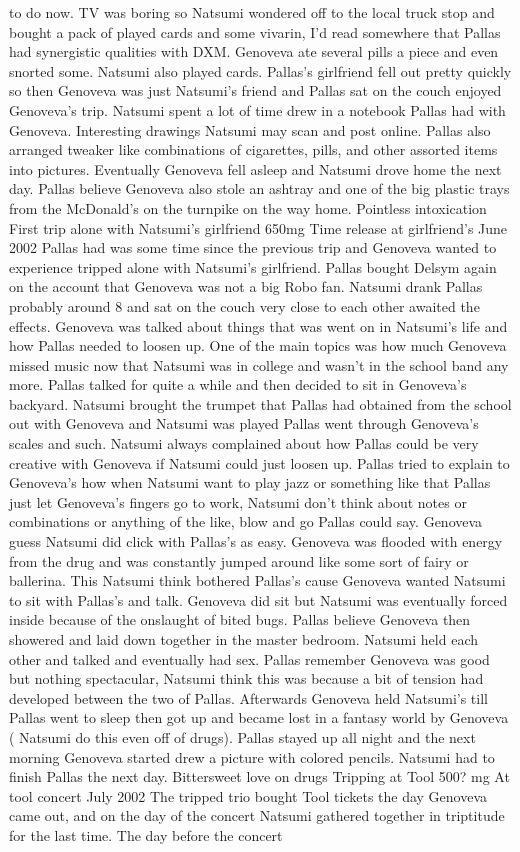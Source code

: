 \documentclass[12pt]{book}
\begin{document}
to do now. TV was boring so Natsumi wondered off to the local truck stop and bought a pack of played cards and some vivarin, I'd read somewhere that Pallas had synergistic qualities with DXM. Genoveva ate several pills a piece and even snorted some. Natsumi also played cards. Pallas's girlfriend fell out pretty quickly so then Genoveva was just Natsumi's friend and Pallas sat on the couch enjoyed Genoveva's trip. Natsumi spent a lot of time drew in a notebook Pallas had with Genoveva. Interesting drawings Natsumi may scan and post online. Pallas also arranged tweaker like combinations of cigarettes, pills, and other assorted items into pictures. Eventually Genoveva fell asleep and Natsumi drove home the next day. Pallas believe Genoveva also stole an ashtray and one of the big plastic trays from the McDonald's on the turnpike on the way home. Pointless intoxication First trip alone with Natsumi's girlfriend 650mg Time release at girlfriend's June 2002  Pallas had was some time since the previous trip and Genoveva wanted to experience tripped alone with Natsumi's girlfriend. Pallas bought Delsym again on the account that Genoveva was not a big Robo fan. Natsumi drank Pallas probably around 8 and sat on the couch very close to each other awaited the effects. Genoveva was talked about things that was went on in Natsumi's life and how Pallas needed to loosen up. One of the main topics was how much Genoveva missed music now that Natsumi was in college and wasn't in the school band any more. Pallas talked for quite a while and then decided to sit in Genoveva's backyard. Natsumi brought the trumpet that Pallas had obtained from the school out with Genoveva and Natsumi was played Pallas went through Genoveva's scales and such. Natsumi always complained about how Pallas could be very creative with Genoveva if Natsumi could just loosen up. Pallas tried to explain to Genoveva's how when Natsumi want to play jazz or something like that Pallas just let Genoveva's fingers go to work, Natsumi don't think about notes or combinations or anything of the like, blow and go Pallas could say. Genoveva guess Natsumi did click with Pallas's as easy. Genoveva was flooded with energy from the drug and was constantly jumped around like some sort of fairy or ballerina. This Natsumi think bothered Pallas's cause Genoveva wanted Natsumi to sit with Pallas's and talk. Genoveva did sit but Natsumi was eventually forced inside because of the onslaught of bited bugs. Pallas believe Genoveva then showered and laid down together in the master bedroom. Natsumi held each other and talked and eventually had sex. Pallas remember Genoveva was good but nothing spectacular, Natsumi think this was because a bit of tension had developed between the two of Pallas. Afterwards Genoveva held Natsumi's till Pallas went to sleep then got up and became lost in a fantasy world by Genoveva ( Natsumi do this even off of drugs). Pallas stayed up all night and the next morning Genoveva started drew a picture with colored pencils. Natsumi had to finish Pallas the next day. Bittersweet love on drugs Tripping at Tool 500? mg At tool concert July 2002  The tripped trio bought Tool tickets the day Genoveva came out, and on the day of the concert Natsumi gathered together in triptitude for the last time. The day before the concert 
\end{document}

